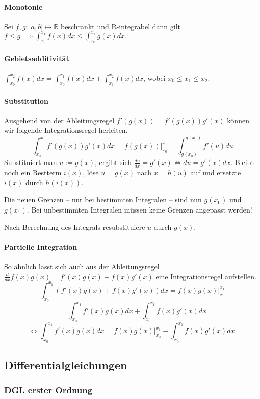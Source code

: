 \documentclass[a4paper, 9pt, DIV=24]{scrartcl}
\begin{document}
\paragraph{Monotonie}
Sei $f,g : ]a,b[ \mapsto \mathbb{R}$ beschränkt und R-integrabel dann gilt
$ f \leq g \implies \int_{x_0}^{x_1}f(x)dx \leq \int_{x_0}^{x_1}g(x)dx. $
\paragraph{Gebietsadditivität}
$\int_{x_0}^{x_2}f(x)dx = \int_{x_0}^{x_1}f(x)dx + \int_{x_1}^{x_2}f(x)dx$, wobei $x_0 \leq x_1 \leq x_2$.

\paragraph{Substitution}
Ausgehend von der Ableitungsregel $f'(g(x)) = f'(g(x))g'(x)$ können wir folgende Integrationsregel herleiten.
\[ \int_{x_0}^{x_1}f'(g(x))g'(x)dx = f(g(x))|_{x_0}^{x_1} = \int_{g(x_0)}^{g(x_1)}f'(u)du \]
Substituiert man $u := g(x)$, ergibt sich $\frac{du}{dx} = g'(x) \iff du = g'(x)dx$.
Bleibt noch ein Restterm $i(x)$, löse $u = g(x)$ nach $x = h(u)$ auf und ersetzte $i(x)$ durch $h(i(x))$.

Die neuen Grenzen -- nur bei bestimmten Integralen -- sind nun $g(x_0)$ und $g(x_1)$.
Bei unbestimmten Integralen müssen keine Grenzen angepasst werden!

Nach Berechnung des Integrals resubstituiere $u$ durch $g(x)$.

\paragraph{Partielle Integration}
So ähnlich lässt sich auch aus der Ableitungsregel $\frac{d}{dx}f(x)g(x) = f'(x)g(x) + f(x)g'(x)$ eine Integrationsregel aufstellen.
\[ \int_{x_0}^{x_1}(f'(x)g(x)+f(x)g'(x))dx = f(x)g(x)|_{x_0}^{x_1} \]
\[ = \int_{x_0}^{x_1}f'(x)g(x)dx + \int_{x_0}^{x_1}f(x)g'(x)dx \]
\[ \iff \int_{x_0}^{x_1}f'(x)g(x)dx = f(x)g(x)|_{x_0}^{x_1} - \int_{x_0}^{x_1}f(x)g'(x)dx. \]

\subsection{Differentialgleichungen}

\subsubsection{DGL erster Ordnung}
\end{document}
